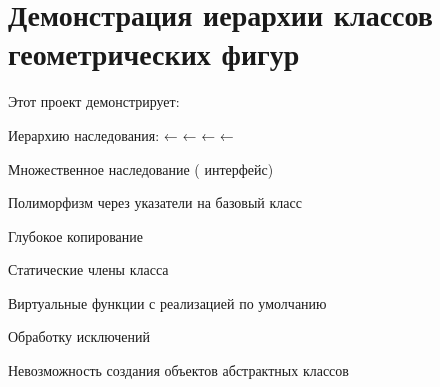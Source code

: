 \chapter{Демонстрация иерархии классов геометрических фигур}
\hypertarget{index}{}\label{index}
Этот проект демонстрирует\+:
\begin{DoxyEnumerate}
\item Иерархию наследования\+:  ←  ←  ←  ← 
\item Множественное наследование ( интерфейс)
\item Полиморфизм через указатели на базовый класс
\item Глубокое копирование
\item Статические члены класса
\item Виртуальные функции с реализацией по умолчанию
\item Обработку исключений
\item Невозможность создания объектов абстрактных классов 
\end{DoxyEnumerate}